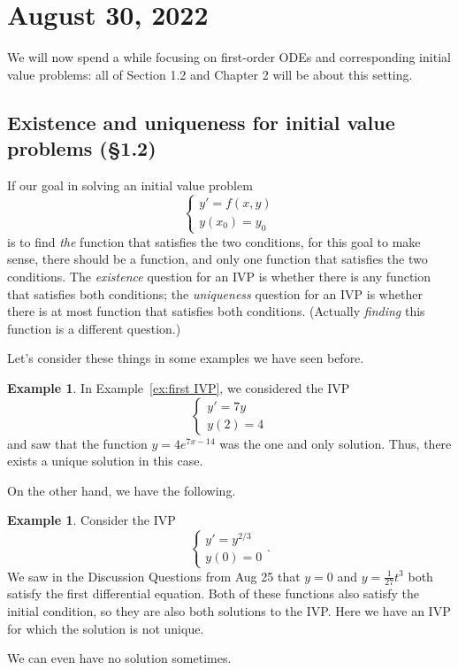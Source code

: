 \documentclass[12pt]{amsart}
\numberwithin{equation}{section}
\theoremstyle{plain} %
\newcommand{\Aug}[1]{\section{August #1, 2022}}
\theoremstyle{definition}
\newtheorem{ex}[equation]{Example}
\theoremstyle{remark}
\begin{document}
\Aug{30}

We will now spend a while focusing on first-order ODEs and corresponding initial value problems: all of Section 1.2 and Chapter 2 will be about this setting.

\subsection*{Existence and uniqueness for initial value problems (\S1.2)}
If our goal in solving an initial value problem
\[\begin{cases} y' = f(x,y) \\ y(x_0) = y_0\end{cases}\]
 is to find \emph{the} function that satisfies the two conditions, for this goal to make sense, there should be a function, and only one function that satisfies the two conditions. The \emph{existence} question for an IVP is whether there is any function that satisfies both conditions; the \emph{uniqueness} question for an IVP is whether there is at most function that satisfies both conditions. (Actually \emph{finding} this function is a different question.)

Let's consider these things in some examples we have seen before.

\begin{ex} In Example~\ref{ex:first IVP}, we considered the IVP
\[\begin{cases} y' = 7y \\ 
y(2)=4 \end{cases}\]
and saw that the function $y= 4 e^{7x-14}$ was the one and only solution. Thus, there exists a unique solution in this case.
\end{ex}


On the other hand, we have the following.

\begin{ex} Consider the IVP
\[\begin{cases} y' = y^{2/3} \\ 
y(0)=0 \end{cases}.\]
We saw in the Discussion Questions from Aug 25 that $y=0$ and $y=\frac{1}{27} t^3$ both satisfy the first differential equation. Both of these functions also satisfy the initial condition, so they are also both solutions to the IVP. Here we have an IVP for which the solution is not unique.
\end{ex}

We can even have no solution sometimes.
\end{document}
